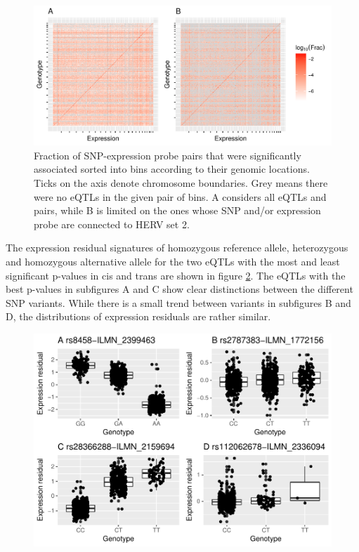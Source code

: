 \documentclass[a4paper,12pt,twoside,openright]{article}
\begin{document}
\begin{figure}[tb]
	\includegraphics[scale = 1, keepaspectratio = true]{../figures/eqtl_all_herv_heatmap}  
	\caption{Fraction of SNP-expression probe pairs that were significantly associated sorted into bins according to their genomic locations. Ticks on the axis denote chromosome boundaries. Grey means there were no eQTLs in the given pair of bins. A considers all eQTLs and pairs, while B is limited on the ones whose SNP and/or expression probe are connected to HERV set 2.}
    \label{fig:global.eqtl.heatmap}
\end{figure}

The expression residual signatures of homozygous reference allele, heterozygous and homozygous alternative allele for the two eQTLs with the most and least significant p-values in cis and trans are shown in figure \ref{fig:best.worst.eqtl.boxplot}. The eQTLs with the best p-values in subfigures A and C show clear distinctions between the different SNP variants. While there is a small trend between variants in subfigures B and D, the distributions of expression residuals are rather similar.    

\begin{figure}[tb]
	\includegraphics[scale = 1, keepaspectratio = true]{../figures/best_worst_eqtl_boxplots}  
	\caption{}
    \label{fig:best.worst.eqtl.boxplot}
\end{figure}
\end{document}
